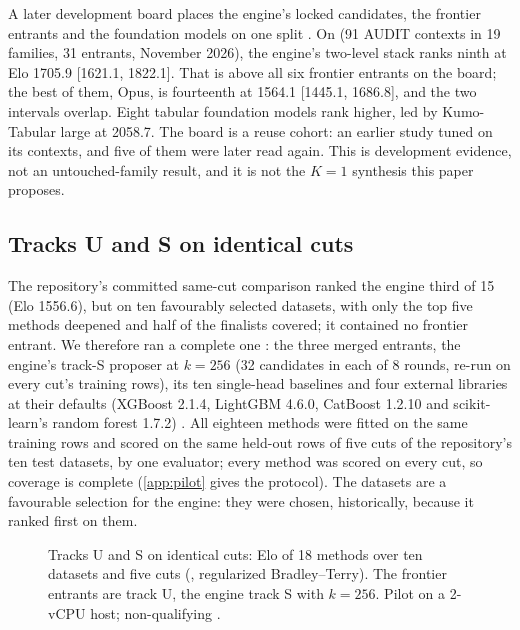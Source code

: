 A later development board places the engine's locked candidates, the frontier entrants and the
foundation models on one split \pre. On  (91 AUDIT contexts in 19
families, 31 entrants, November 2026), the engine's two-level stack ranks ninth at Elo 1705.9
[1621.1, 1822.1]. That is above all six frontier entrants on the board; the best of them, Opus, is
fourteenth at 1564.1 [1445.1, 1686.8], and the two intervals overlap. Eight tabular foundation
models rank higher, led by Kumo-Tabular large at 2058.7. The board is a reuse cohort: an earlier
study tuned on its contexts, and five of them were later read again. This is development evidence,
not an untouched-family result, and it is not the $K=1$ synthesis this paper proposes.

\subsection{Tracks U and S on identical cuts}
\label{sec:pilot}

The repository's committed same-cut comparison ranked the engine third of 15 (Elo 1556.6), but on
ten favourably selected datasets, with only the top five methods deepened and half of the finalists
covered; it contained no frontier entrant. We therefore ran a complete one \pre: the three
merged entrants, the engine's track-S proposer at $k=256$ (32 candidates in each of 8 rounds,
re-run on every cut's training rows), its ten single-head baselines and four external libraries at
their defaults (XGBoost 2.1.4, LightGBM 4.6.0, CatBoost 1.2.10 and scikit-learn's random forest
1.7.2) \citep{chen2016xgboost,ke2017lightgbm,prokhorenkova2018catboost,breiman2001rf}. All eighteen
methods were fitted on the same training rows and scored on the same held-out rows of five cuts of
the repository's ten test datasets, by one evaluator; every method was scored on every cut, so
coverage is complete (\cref{app:pilot} gives the protocol). The datasets are a favourable selection
for the engine: they were chosen, historically, because it ranked first on them.

\begin{figure}[t]
\centering

\caption{Tracks U and S on identical cuts: Elo of 18 methods over ten datasets and five cuts
(, regularized Bradley--Terry). The frontier entrants are track U, the engine track
S with $k=256$. Pilot on a 2-vCPU host; non-qualifying \pre.}
\label{fig:ladder}
\end{figure}

